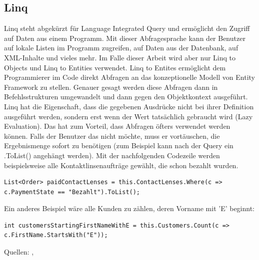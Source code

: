 \subsection{Linq}
Linq steht abgekürzt für Language Integrated Query und ermöglicht den Zugriff auf Daten aus einem Programm. Mit dieser Abfragesprache kann der Benutzer auf lokale Listen im Programm zugreifen, auf Daten aus der Datenbank, auf XML-Inhalte und vieles mehr. Im Falle dieser Arbeit wird aber nur Linq to Objects und Linq to Entities verwendet. Linq to Entites ermöglicht dem Programmierer im Code direkt Abfragen an das konzeptionelle Modell von Entity Framework zu stellen. Genauer gesagt werden diese Abfragen dann in Befehlsstrukturen umgewandelt und dann gegen den Objektkontext ausgeführt.
\newline Linq hat die Eigenschaft, dass die gegebenen Ausdrücke nicht bei ihrer Definition ausgeführt werden, sondern erst wenn der Wert tatsächlich gebraucht wird (Lazy Evaluation). Das hat zum Vorteil, dass Abfragen öfters verwendet werden können. Falls der Benutzer das nicht möchte, muss er vortäuschen, die Ergebnismenge sofort zu benötigen (zum Beispiel kann nach der Query ein .ToList() angehängt werden).
\newline Mit der nachfolgenden Codezeile werden beispielsweise alle Kontaktlinsenaufträge gewählt, die schon bezahlt wurden.
\begin{lstlisting}
List<Order> paidContactLenses = this.ContactLenses.Where(c => c.PaymentState == "Bezahlt").ToList();
\end{lstlisting}
Ein anderes Beispiel wäre alle Kunden zu zählen, deren Vorname mit 'E' beginnt:
\begin{lstlisting}
int customersStartingFirstNameWithE = this.Customers.Count(c => c.FirstName.StartsWith("E"));
\end{lstlisting}
Quellen: \cite{wikipedia_linq_2018}, \cite{microsoft_linq_2018}
